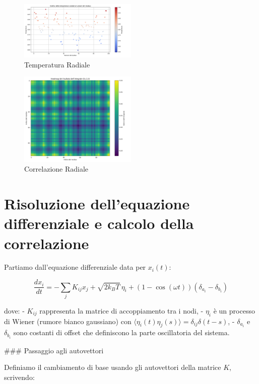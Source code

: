 \documentclass{article}
\begin{document}
\begin{figure}[H]
    \centering
    \includegraphics[width=0.5\textwidth]{"images/2m10_2_temperature_sferic.png"}
    \caption{Temperatura Radiale}
\end{figure}
\begin{figure}[H]
    \centering
    \includegraphics[width=0.5\textwidth]{"images/2m10_2_temperature_correlation_sferic.png"}
    \caption{Correlazione Radiale}
\end{figure}






\section*{Risoluzione dell'equazione differenziale e calcolo della correlazione}

Partiamo dall'equazione differenziale data per \( x_i(t) \):

\[
\frac{dx_i}{dt} = -\sum_j K_{ij} x_j + \sqrt{2 k_B T} \, \eta_i + \left(1 - \cos(\omega t)\right)(\delta_{a_i} - \delta_{b_i})
\]

dove:
- \( K_{ij} \) rappresenta la matrice di accoppiamento tra i nodi,
- \( \eta_i \) è un processo di Wiener (rumore bianco gaussiano) con \(\langle \eta_i(t) \eta_j(s) \rangle = \delta_{ij} \delta(t - s)\),
- \( \delta_{a_i} \) e \( \delta_{b_i} \) sono costanti di offset che definiscono la parte oscillatoria del sistema.

### Passaggio agli autovettori

Definiamo il cambiamento di base usando gli autovettori della matrice \( K \), scrivendo:
\end{document}
